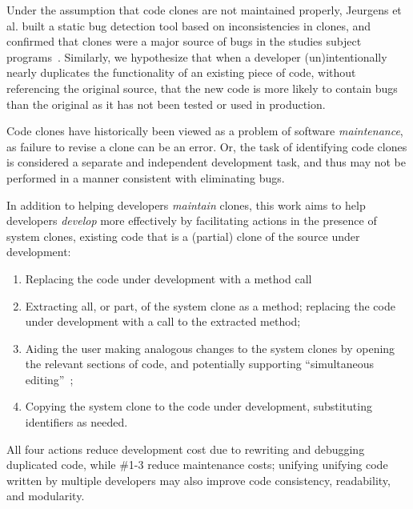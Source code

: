 \documentclass[preprint,10pt]{sigplanconf}
\begin{document}

Under the assumption that code clones are not maintained properly,
Jeurgens et al. built a static bug detection tool based on
inconsistencies in clones, and confirmed that clones were a major
source of bugs in the studies subject programs~\cite{Juergens2009}.
Similarly, we hypothesize that when a developer (un)intentionally
nearly duplicates the functionality of an existing piece of code, without
referencing the original source, that the new code is more likely to
contain bugs than the original as it has not been tested or used in
production.

Code clones have historically been viewed as a problem of software
\emph{maintenance}, as failure to revise a clone can be an error. 
Or, the task of identifying code clones is considered a separate and
independent development task, and thus may not be performed in a
manner consistent with eliminating bugs.

In addition to helping developers \emph{maintain} clones, this work
aims to help developers \emph{develop} more effectively by
facilitating actions in the presence of system clones, existing code
that is a (partial) clone of the source under development:

\begin{enumerate}
  \item Replacing the code under development with a method call
  \item Extracting all, or part, of the system clone as a method;
    replacing the code under development with a call to the extracted
    method;
  \item Aiding the user making analogous changes to the system clones
    by opening the relevant sections of code, and potentially
    supporting ``simultaneous editing''~\cite{Miller2002};
  \item Copying the system clone to the code under development,
    substituting identifiers as needed.
\end{enumerate}

All four actions reduce development cost due to rewriting and
debugging duplicated code, while \#1-3 reduce maintenance costs;
unifying unifying code written by multiple developers may also improve
code consistency, readability, and modularity.
\end{document}
